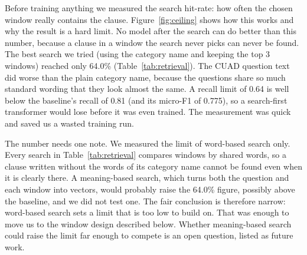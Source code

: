 Before training anything we measured the search hit-rate: how often the chosen window really contains the clause. Figure~\ref{fig:ceiling} shows how this works and why the result is a hard limit. No model after the search can do better than this number, because a clause in a window the search never picks can never be found. The best search we tried (using the category name and keeping the top 3 windows) reached only 64.0\% (Table~\ref{tab:retrieval}). The CUAD question text did worse than the plain category name, because the questions share so much standard wording that they look almost the same. A recall limit of 0.64 is well below the baseline's recall of 0.81 (and its micro-F1 of 0.775), so a search-first transformer would lose before it was even trained. The measurement was quick and saved us a wasted training run.

The number needs one note. We measured the limit of word-based search only. Every search in Table~\ref{tab:retrieval} compares windows by shared words, so a clause written without the words of its category name cannot be found even when it is clearly there. A meaning-based search, which turns both the question and each window into vectors, would probably raise the 64.0\% figure, possibly above the baseline, and we did not test one. The fair conclusion is therefore narrow: word-based search sets a limit that is too low to build on. That was enough to move us to the window design described below. Whether meaning-based search could raise the limit far enough to compete is an open question, listed as future work.

